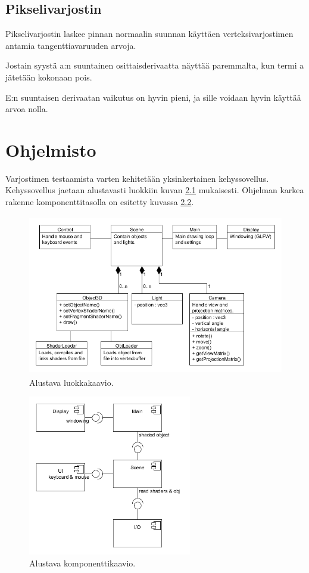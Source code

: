 \documentclass[utf8,bachelor]{gradu3}
\begin{document}
\section{Pikselivarjostin}

Pikselivarjostin laskee pinnan normaalin suunnan käyttäen verteksivarjostimen antamia tangenttiavaruuden arvoja.

Jostain syystä a:n suuntainen osittaisderivaatta näyttää paremmalta, kun termi a jätetään kokonaan pois.

E:n suuntaisen derivaatan vaikutus on hyvin pieni, ja sille voidaan hyvin käyttää arvoa nolla.

\chapter{Ohjelmisto}

Varjostimen testaamista varten kehitetään yksinkertainen kehyssovellus. Kehyssovellus jaetaan alustavasti luokkiin kuvan \ref{fig:ClassDiagram} mukaisesti. Ohjelman karkea rakenne komponenttitasolla on esitetty kuvassa \ref{fig:ComponentDiagram}.

\begin{figure}[h] 
	\centering
	\includegraphics[height=7cm]{ClassDiagram.png}
	\caption{Alustava luokkakaavio.}
	\label{fig:ClassDiagram}
\end{figure}

\begin{figure}[h] 
	\centering
	\includegraphics[height=7cm]{ComponentDiagram.png}
	\caption{Alustava komponenttikaavio.}
	\label{fig:ComponentDiagram}
\end{figure}

\printbibliography 
\end{document}
